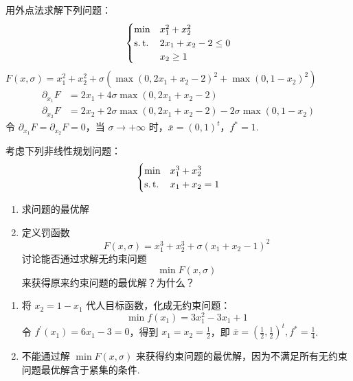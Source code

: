 \begin{problem}[P413 1.(4)]
    用外点法求解下列问题：\[\begin{cases}
        \min &x_1^2 + x_2^2\\
        \operatorname{s.t.} & 2x_1 + x_2 - 2 \le 0\\
        &x_2 \ge 1
    \end{cases}\]
    \Answer $F(x, \sigma) = x_1^2 + x_2^2 + \sigma\left(\max(0, 2x_1 + x_2 - 2)^2 + \max(0, 1 - x_2)^2\right)$
    \begin{align*}
        \partial_{x_1}F &= 2x_1 + 4\sigma\max(0, 2x_1 + x_2 - 2)\\
        \partial_{x_2}F &= 2x_2 + 2\sigma\max(0, 2x_1 + x_2 - 2) - 2\sigma\max(0, 1 - x_2) 
    \end{align*}  
    令 $\partial_{x_1}F = \partial_{x_2}F = 0$，当 $\sigma \to +\infty$ 时，$\bar{x} = (0, 1)^t$，$f^* = 1$.
\end{problem}

\begin{problem}[P413 2]
    考虑下列非线性规划问题：\[\begin{cases}
        \min &x_1^3 + x_2^3\\
        \operatorname{s.t.} & x_1 + x_2 = 1\\
    \end{cases}\]
    \begin{enumerate}
        \item 求问题的最优解
        \item 定义罚函数\[F(x, \sigma) = x_1^3 + x_2^3 + \sigma(x_1 + x_2 - 1)^2\] 讨论能否通过求解无约束问题\[\min F(x, \sigma)\]来获得原来约束问题的最优解？为什么？
    \end{enumerate}
    \Answer \begin{enumerate}
        \item 将 $x_2 = 1 - x_1$ 代人目标函数，化成无约束问题：\[\min f(x_1) = 3x_1^2 - 3x_1 + 1\]令 $f^\prime(x_1) = 6x_1 - 3 = 0$，得到 $x_1 = x_2 = \frac{1}{2}$，即 $\bar{x} = (\frac{1}{2}, \frac{1}{2})^t, f^* = \frac{1}{4}$.
        \item 不能通过解 $\min F(x, \sigma)$ 来获得约束问题的最优解，因为不满足所有无约束问题最优解含于紧集的条件.
    \end{enumerate}
\end{problem}

